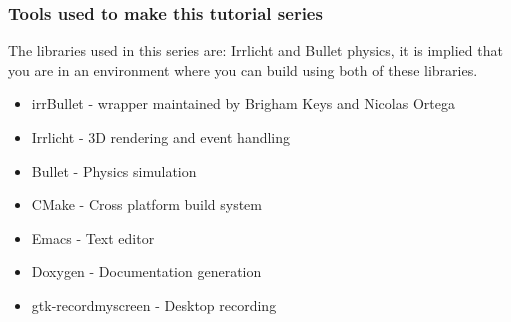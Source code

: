 \documentclass{beamer}
\begin{document}
\begin{frame}
\frametitle{Tools used to make this tutorial series}
The libraries used in this series are: Irrlicht and Bullet physics, it is implied that you are in an environment where you can build using both of these libraries.
\begin{itemize}
\item irrBullet - wrapper maintained by Brigham Keys and Nicolas Ortega
\item Irrlicht - 3D rendering and event handling
\item Bullet - Physics simulation
\item CMake - Cross platform build system
\item Emacs - Text editor
\item Doxygen - Documentation generation
\item gtk-recordmyscreen - Desktop recording
\end{itemize}
\end{frame}

\end{document}
